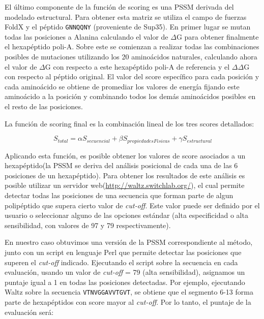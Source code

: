 El último componente de la función de scoring es una PSSM derivada del modelado estructural. 
Para obtener esta matriz se utiliza el campo de fuerzas FoldX y el péptido \texttt{GNNQQNY} (proveniente de Sup35).
En primer lugar se mutan todas las posiciones a Alanina calculando el valor de $\Delta$G para obtener finalmente el hexapéptido poli-A.
Sobre este se comienzan a realizar todas las combinaciones posibles de mutaciones utilizando los 20 aminoácidos naturales, calculando ahora el valor de $\Delta$G con respecto a este hexapéptido poli-A de referencia y 
el $\Delta\Delta$G con respecto al péptido original. 
El valor del score específico para cada posición y cada aminoácido se obtiene de promediar los valores de energía fijando este aminoácido a la posición y combinando todos los demás aminoácidos posibles en el resto de las posiciones.


La función de scoring final es la combinación lineal de los tres scores detallados:

{
\large
\begin{equation}
S_{total}= \alpha S_{secuencial} + \beta S_{propiedadesFisicas} + \gamma S_{estructural}
\end{equation}
}

Aplicando esta función, es posible obtener los valores de score asociados a un hexapéptido(la PSSM se deriva del análisis posicional de cada una de las 6 posiciones de un hexapéptido).
Para obtener los resultados de este análisis es posible utilizar un servidor web(\url{http://waltz.switchlab.org/}), el cual permite detectar todas las posiciones de una secuencia que forman parte de algun polipéptido que supera cierto
valor de \textit{cut-off}. Este valor puede ser definido por el usuario o seleccionar alguno de las opciones estándar (alta especificidad o alta sensibilidad, con valores de 97 y 79 respectivamente).

En nuestro caso obtuvimos una versión de la PSSM correspondiente al método, junto con un script en lenguaje Perl que permite detectar las posiciones que superen el \textit{cut-off} indicado.
Ejecutando el script sobre la secuencia en cada evaluación, usando un valor de \textit{cut-off} = 79 (alta sensibilidad), asignamos un puntaje igual a 1 en todas las posiciones detectadas.
Por ejemplo, ejecutando Waltz sobre la secuencia \texttt{VTNVGGAVVTGVT}, se obtiene que el segmento 6-13 forma parte de hexapéptidos con score mayor al \textit{cut-off}. Por lo tanto, el puntaje de la evaluación será:


